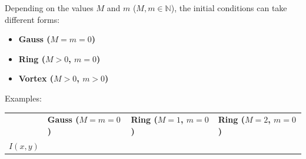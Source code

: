 \documentclass[a4paper, 12pt]{article}
\begin{document}
Depending on the values $M$ and $m$ ($M, m \in \mathbb{N}$), the initial conditions can take different forms:
\begin{itemize}
\item \textbf{Gauss ($M=m=0$)} 
\item \textbf{Ring ($M>0$, $m=0$)} 
\item \textbf{Vortex ($M>0$, $m>0$)}
\end{itemize}
Examples:
\begin{center}
\begin{tabular}{M{1cm}M{5cm}M{5cm}M{5cm}}
\ & \textbf{Gauss ($M=m=0$)} & \textbf{Ring ($M=1$, $m=0$)} & \textbf{Ring ($M=2$, $m=0$)} \\
$I(x,y)$ &
 & 
 & 
 \\
\end{tabular}
\end{center}
\end{document}
